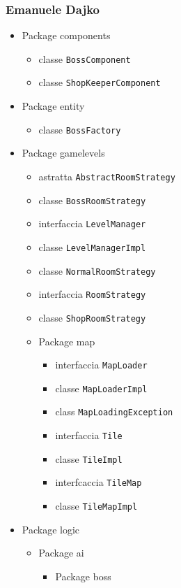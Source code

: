 \documentclass[a4paper,12pt]{report}
\begin{document}
\subsubsection{Emanuele Dajko}
\begin{itemize}
	\item Package components
	\begin{itemize}
		\item classe \texttt{BossComponent}
		\item classe \texttt{ShopKeeperComponent}
	\end{itemize}
	\item Package entity
	\begin{itemize}
		\item classe \texttt{BossFactory}
	\end{itemize}
	\item Package gamelevels
	\begin{itemize}
		\item astratta \texttt{AbstractRoomStrategy}
		\item classe \texttt{BossRoomStrategy}
		\item interfaccia \texttt{LevelManager}
		\item classe \texttt{LevelManagerImpl}
		\item classe \texttt{NormalRoomStrategy}
		\item interfaccia \texttt{RoomStrategy}
		\item classe \texttt{ShopRoomStrategy}
		\item Package map
		\begin{itemize}
			\item interfaccia \texttt{MapLoader}
			\item classe \texttt{MapLoaderImpl}
			\item class \texttt{MapLoadingException}
			\item interfaccia \texttt{Tile}
			\item classe \texttt{TileImpl}
			\item interfcaccia \texttt{TileMap}
			\item classe \texttt{TileMapImpl}
		\end{itemize}
	\end{itemize}
	\item Package logic
	\begin{itemize}
		\item Package ai
		\begin{itemize}
			\item Package boss

\end{itemize}
\end{itemize}
\end{itemize}
\end{document}
